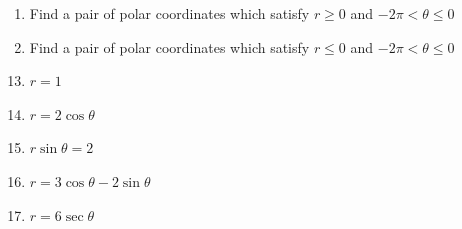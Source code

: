 \documentclass[12pt]{article}
\newif\ifans
\begin{document}
\begin{enumerate}
\begin{enumerate}
\item Find a pair of polar coordinates which satisfy $r \geq 0$ and $-2\pi < \theta \leq 0$

\ifans{\fbox{$(r,\theta)=\left(2,-\frac{5\pi}{3}\right)$; }} \fi

\item Find a pair of polar coordinates which satisfy $r \leq 0$ and $-2\pi < \theta \leq 0$

\ifans{\fbox{$(r,\theta)=\left(-2,-\frac{2\pi}{3}\right)$}} \fi

\end{enumerate}

\end{enumerate}


\begin{enumerate}
\setcounter{enumi}{12}

\item $r=1$ 

\ifans{\fbox{circle, $x^2+y^2=1$}} \fi

\item $r=2\cos{\theta}$ 

\ifans{\fbox{circle, $(x-1)^2+y^2=1$}} \fi

\item $r\sin{\theta}=2$ 

\ifans{\fbox{line, $y=2$}} \fi

\item $r=3\cos{\theta}-2\sin{\theta}$

\ifans{\fbox{circle, $\left(x-\frac{3}{2}\right)^2+(y+1)^2=\frac{13}{4}$; Detailed Solution: \textcolor{blue}{\href{http://www.math.drexel.edu/classes/Calculus/resources/Math122HW/Solutions/122_18_Polar_16.pdf}{Here}}}}\fi

\item $r=6\sec{\theta}$

\ifans{\fbox{line, $x=6$}} \fi

\end{enumerate}

\end{document}
